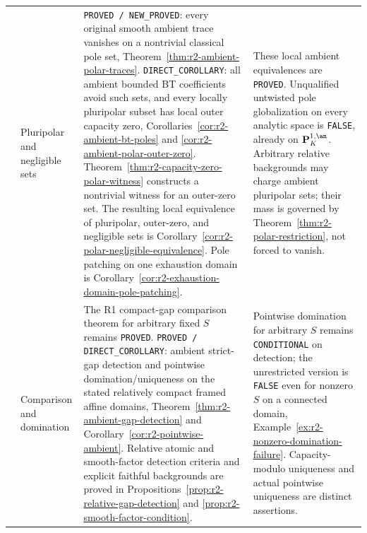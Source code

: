 \begin{longtable}{@{}>{\raggedright\arraybackslash}p{}>{\raggedright\arraybackslash}p{}>{\raggedright\arraybackslash}p{}>{\raggedright\arraybackslash}p{}@{}}
8 & Pluripolar and negligible sets &
\texttt{PROVED / NEW\_PROVED}: every original smooth ambient trace
vanishes on a nontrivial classical pole set,
Theorem~\ref{thm:r2-ambient-polar-traces}.
\texttt{DIRECT\_COROLLARY}: all ambient bounded BT coefficients avoid
such sets, and every locally pluripolar subset has local outer
capacity zero, Corollaries~\ref{cor:r2-ambient-bt-poles} and
\ref{cor:r2-ambient-polar-outer-zero}.
Theorem~\ref{thm:r2-capacity-zero-polar-witness} constructs a
nontrivial witness for an outer-zero set. The resulting local
equivalence of pluripolar, outer-zero, and negligible sets is
Corollary~\ref{cor:r2-polar-negligible-equivalence}.
Pole patching on one exhaustion domain is
Corollary~\ref{cor:r2-exhaustion-domain-pole-patching}. &
These local ambient equivalences are \texttt{PROVED}.
Unqualified untwisted pole globalization on every analytic space is
\texttt{FALSE}, already on $\mathbf P^{1,\an}_K$.
Arbitrary relative backgrounds may charge ambient pluripolar sets;
their mass is governed by
Theorem~\ref{thm:r2-polar-restriction}, not forced to vanish.\\[5pt]

9 & Comparison and domination &
The R1 compact-gap comparison theorem for arbitrary fixed $S$
remains \texttt{PROVED}.
\texttt{PROVED / DIRECT\_COROLLARY}: ambient strict-gap detection and
pointwise domination/uniqueness on the stated relatively compact
framed affine domains, Theorem~\ref{thm:r2-ambient-gap-detection}
and Corollary~\ref{cor:r2-pointwise-ambient}.
Relative atomic and smooth-factor detection criteria and explicit
faithful backgrounds are proved in
Propositions~\ref{prop:r2-relative-gap-detection} and
\ref{prop:r2-smooth-factor-condition}. &
Pointwise domination for arbitrary $S$ remains
\texttt{CONDITIONAL} on detection; the unrestricted version is
\texttt{FALSE} even for nonzero $S$ on a connected domain,
Example~\ref{ex:r2-nonzero-domination-failure}.
Capacity-modulo uniqueness and actual pointwise uniqueness are
distinct assertions.\\[5pt]


\end{longtable}
